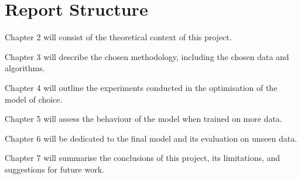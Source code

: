\section{Report Structure} \label{report_struct}
\begin{inparaitem}[]
    \item Chapter 2 will consist of the theoretical context of this project. 
    \item Chapter 3 will describe the chosen methodology, including the chosen data and algorithms. 
    \item Chapter 4 will outline the experiments conducted in the optimisation of the model of choice.
    \item Chapter 5 will assess the behaviour of the model when trained on more data.
    \item Chapter 6 will be dedicated to the final model and its evaluation on unseen data.
    \item Chapter 7 will summarise the conclusions of this project, its limitations, and suggestions for future work.
\end{inparaitem}